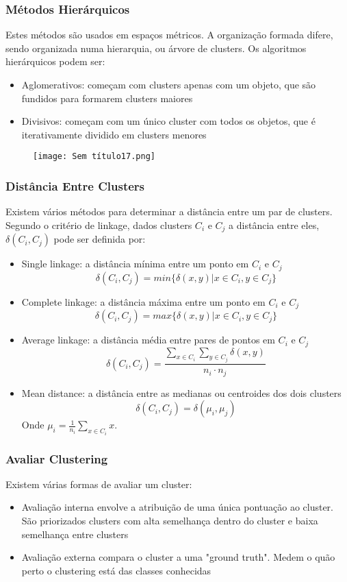 \documentclass[10pt,a4paper]{report}
\begin{document}
\subsubsection{Métodos Hierárquicos}
Estes métodos são usados em espaços métricos. A organização formada difere, sendo organizada numa hierarquia, ou árvore de clusters. Os algoritmos hierárquicos podem ser:
\begin{itemize}
\item Aglomerativos: começam com clusters apenas com um objeto, que são fundidos para formarem clusters maiores
\item Divisivos: começam com um único cluster com todos os objetos, que é iterativamente dividido em clusters menores
\end{itemize}
\begin{figure}[H]
\centering
\texttt{[image: Sem título17.png]}
\end{figure}
\subsubsection{Distância Entre Clusters}
Existem vários métodos para determinar a distância entre um par de clusters. Segundo o critério de linkage, dados clusters $C_i$ e $C_j$ a distância entre eles, $\delta(C_i,C_j)$ pode ser definida por:
\begin{itemize}
\item Single linkage: a distância mínima entre um ponto em $C_i$ e $C_j$
$$
\delta(C_i, C_j) = min \{\delta(x,y) | x\in C_i, y \in C_j\}
$$
\item Complete linkage: a distância máxima entre um ponto em $C_i$ e $C_j$
$$
\delta(C_i, C_j) = max \{\delta(x,y) | x\in C_i, y \in C_j\}
$$
\item Average linkage: a distância média entre pares de pontos em $C_i$ e $C_j$
$$
\delta(C_i, C_j) = \frac{\sum_{x \in C_i}\sum_{y \in C_j} \delta(x,y)}{n_i \cdot n_j}
$$
\item Mean distance: a distância entre as medianas ou centroides dos dois clusters
$$
\delta(C_i, C_j) = \delta(\mu_i,\mu_j)
$$
Onde $\mu_i = \frac{1}{n_i} \sum_{x\in C_i} x$.
\end{itemize}
\subsubsection{Avaliar Clustering}
Existem várias formas de avaliar um cluster:
\begin{itemize}
\item Avaliação interna envolve a atribuição de uma única pontuação ao cluster. São priorizados clusters com alta semelhança dentro do cluster e baixa semelhança entre clusters
\item Avaliação externa compara o cluster a uma "ground truth". Medem o quão perto o clustering está das classes conhecidas
\end{itemize}
\end{document}
